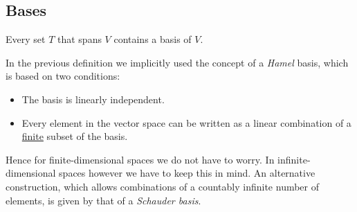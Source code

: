 
\subsection{Bases}

	\begin{result}
		Every set $T$ that spans $V$ contains a basis of $V$.
	\end{result}

	\begin{remark}
		In the previous definition we implicitly used the concept of a \textit{Hamel} basis, which is based on two conditions:
		\begin{itemize}
			\item The basis is linearly independent.
			\item Every element in the vector space can be written as a linear combination of a \underline{finite} subset of the basis.
		\end{itemize}
		Hence for finite-dimensional spaces we do not have to worry. In infinite-dimensional spaces however we have to keep this in mind. An alternative construction, which allows combinations of a countably infinite number of elements, is given by that of a \textit{Schauder basis}.
	\end{remark}

